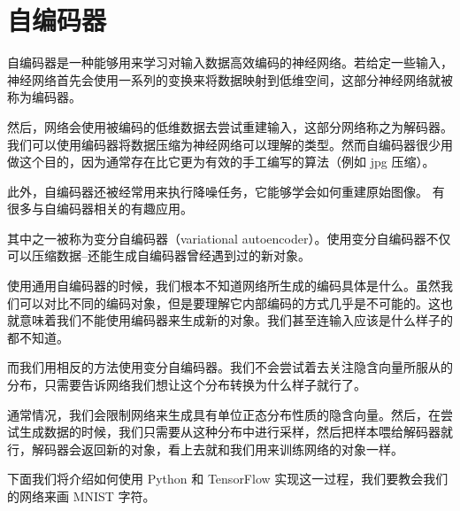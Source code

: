 \documentclass{article}
\begin{document}
\section{自编码器}
自编码器是一种能够用来学习对输入数据高效编码的神经网络。若给定一些输入，神经网络首先会使用一系列的变换来将数据映射到低维空间，这部分神经网络就被称为编码器。

然后，网络会使用被编码的低维数据去尝试重建输入，这部分网络称之为解码器。我们可以使用编码器将数据压缩为神经网络可以理解的类型。然而自编码器很少用做这个目的，因为通常存在比它更为有效的手工编写的算法（例如 jpg 压缩）。

此外，自编码器还被经常用来执行降噪任务，它能够学会如何重建原始图像。
有很多与自编码器相关的有趣应用。

其中之一被称为变分自编码器（variational autoencoder）。使用变分自编码器不仅可以压缩数据--还能生成自编码器曾经遇到过的新对象。

使用通用自编码器的时候，我们根本不知道网络所生成的编码具体是什么。虽然我们可以对比不同的编码对象，但是要理解它内部编码的方式几乎是不可能的。这也就意味着我们不能使用编码器来生成新的对象。我们甚至连输入应该是什么样子的都不知道。

而我们用相反的方法使用变分自编码器。我们不会尝试着去关注隐含向量所服从的分布，只需要告诉网络我们想让这个分布转换为什么样子就行了。

通常情况，我们会限制网络来生成具有单位正态分布性质的隐含向量。然后，在尝试生成数据的时候，我们只需要从这种分布中进行采样，然后把样本喂给解码器就行，解码器会返回新的对象，看上去就和我们用来训练网络的对象一样。

下面我们将介绍如何使用 Python 和 TensorFlow 实现这一过程，我们要教会我们的网络来画 MNIST 字符。
\end{document}
